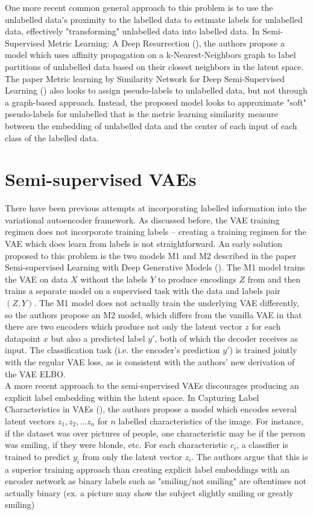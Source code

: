\documentclass[./dissertation.tex]{subfiles}
\begin{document}
One more recent common general approach to this problem is to use the unlabelled data's proximity to the labelled data to estimate labels for unlabelled data, effectively "transforming" unlabelled data into labelled data. In Semi-Supervised Metric Learning: A Deep Resurrection (\cite{dutta2021semi}), the authors propose a model which uses affinity propagation on a k-Nearest-Neighbors graph to label partitions of unlabelled data based on their closest neighbors in the latent space. The paper Metric learning by Similarity Network for Deep Semi-Supervised Learning (\cite{wu2020metric}) also looks to assign pseudo-labels to unlabelled data, but not through a graph-based approach. Instead, the proposed model looks to approximate "soft" pseudo-labels for unlabelled that is the metric learning similarity measure between the embedding of unlabelled data and the center of each input of each class of the labelled data. \\

\section{Semi-supervised VAEs}
There have been previous attempts at incorporating labelled information into the variational autoencoder framework. As discussed before, the VAE training regimen does not incorporate training labels -- creating a training regimen for the VAE which does learn from labels is not straightforward. An early solution proposed to this problem is the two models M1 and M2 described in the paper Semi-supervised Learning with Deep Generative Models (\cite{kingma2014autoencoding}). The M1 model trains the VAE on data $X$ without the labels $Y$ to produce encodings $Z$ from and then trains a separate model on a supervised task with the data and labels pair $(Z, Y)$. The M1 model does not actually train the underlying VAE differently, so the authors propose an M2 model, which differs from the vanilla VAE in that there are two encoders which produce not only the latent vector $z$ for each datapoint $x$ but also a predicted label $y'$, both of which the decoder receives as input. The classification task (i.e. the encoder's prediction $y'$) is trained jointly with the regular VAE loss, as is consistent with the authors' new derivation of the VAE ELBO. \\

A more recent approach to the semi-supervised VAEs discourages producing an explicit label embedding within the latent space. In Capturing Label Characteristics in VAEs (\cite{joy2020capturing}), the authors propose a model which encodes several latent vectors $z_{1}, z_{2}, ... z_{n}$ for $n$ labelled characteristics of the image. For instance, if the dataset was over pictures of people, one characteristic may be if the person was smiling, if they were blonde, etc. For each characteristic $c_{i}$, a classifier is trained to predict $y_{i}$ from only the latent vector $z_{i}$. The authors argue that this is a superior training approach than creating explicit label embeddings with an encoder network as binary labels such as "smiling/not smiling" are oftentimes not actually binary (ex. a picture may show the subject slightly smiling or greatly smiling)
\end{document}
